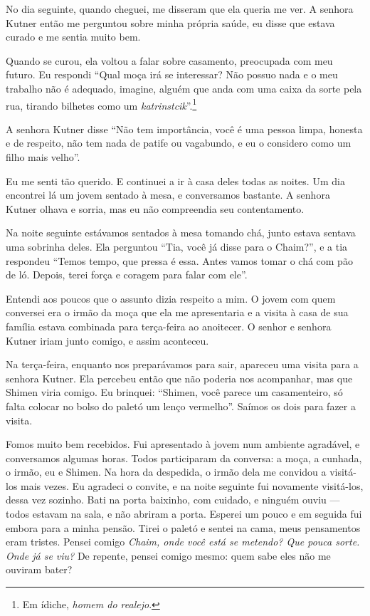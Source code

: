 No dia seguinte, quando cheguei, me disseram que 
ela queria me ver. A senhora Kutner então me perguntou sobre
minha própria saúde, eu disse que estava curado e me sentia muito bem.

Quando se curou, ela voltou a falar sobre casamento,
preocupada com meu futuro. Eu respondi ``Qual moça irá se
interessar? Não possuo nada e o meu trabalho não é adequado, imagine,
alguém que anda com uma caixa da sorte pela rua, tirando bilhetes como
um \textit{katrinstcik}''.\footnote{Em ídiche, \textit{homem do realejo}.}

A senhora Kutner disse ``Não tem importância, você é uma pessoa
limpa, honesta e de respeito, não tem nada de patife ou vagabundo, e eu o
considero como um filho mais velho''.

Eu me senti tão querido. E continuei a ir à casa deles todas as noites.
Um dia encontrei lá um jovem sentado à mesa, e conversamos bastante. A
senhora Kutner olhava e sorria, mas eu não compreendia seu contentamento.

Na noite seguinte estávamos sentados à mesa tomando chá, junto estava
sentava uma sobrinha deles. Ela perguntou ``Tia, você já disse para o
Chaim?'', e a tia respondeu ``Temos tempo, que pressa é essa.
Antes vamos tomar o chá com pão de ló. Depois, terei força e coragem para
falar com ele''.

Entendi aos poucos que o assunto dizia respeito a mim. O jovem com quem conversei
era o irmão da moça que ela me apresentaria e a visita à casa de sua família
estava combinada para terça-feira ao anoitecer. O senhor e senhora Kutner iriam junto
comigo, e assim aconteceu.

Na terça-feira, enquanto nos preparávamos para sair, apareceu uma visita para a
senhora Kutner. Ela percebeu então que não poderia nos acompanhar, mas
que Shimen viria comigo. Eu brinquei: ``Shimen, você
parece um casamenteiro, só falta colocar no bolso do paletó um lenço
vermelho''. Saímos os dois para fazer a visita.

Fomos muito bem recebidos. Fui apresentado à jovem num ambiente
agradável, e conversamos algumas horas. Todos participaram da conversa: a
moça, a cunhada, o irmão, eu e Shimen. Na hora da despedida, o irmão
dela me convidou a visitá-los mais vezes. Eu agradeci o convite, e na noite 
seguinte fui novamente visitá-los, dessa vez sozinho. Bati
na porta baixinho, com cuidado, e ninguém ouviu --- todos
estavam na sala, e não abriram a porta. Esperei um pouco e em seguida fui embora
para a minha pensão. Tirei o paletó e sentei na cama, meus pensamentos eram tristes. 
Pensei comigo \textit{Chaim, onde você está se
metendo? Que pouca sorte. Onde já se viu?} De repente, pensei comigo mesmo: 
quem sabe eles não me ouviram bater?


